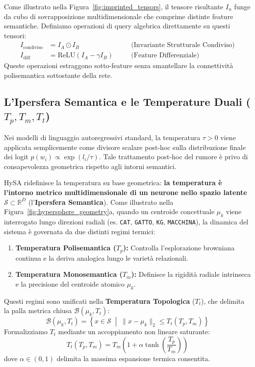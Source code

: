 \documentclass[11pt,a4paper]{article}
\theoremstyle{definition}
\begin{document}
Come illustrato nella Figura~\ref{fig:imprinted_tensors}, il tensore risultante $I_n$ funge da cubo di sovrapposizione multidimensionale che comprime distinte feature semantiche. Definiamo operazioni di query algebrica direttamente su questi tensori:
\begin{align}
    I_{\mathrm{condiviso}} &= I_A \odot I_B \quad &&\text{(Invariante Strutturale Condiviso)} \\
    I_{\mathrm{diff}} &= \mathrm{ReLU}(I_A - \gamma I_B) \quad &&\text{(Feature Differenziale)}
\end{align}
Queste operazioni estraggono sotto-feature senza smantellare la connettività polisemantica sottostante della rete.

\subsection{L'Ipersfera Semantica e le Temperature Duali (\texorpdfstring{$T_p, T_m, T_t$}{Tp, Tm, Tt})}
Nei modelli di linguaggio autoregressivi standard, la temperatura $\tau > 0$ viene applicata semplicemente come divisore scalare post-hoc sulla distribuzione finale dei logit $p(w_i) \propto \exp(l_i / \tau)$. Tale trattamento post-hoc del rumore è privo di consapevolezza geometrica rispetto agli intorni semantici.

HySA ridefinisce la temperatura su base geometrica: \textbf{la temperatura è l'intorno metrico multidimensionale di un neurone nello spazio latente $\mathcal{S} \subset \mathbb{R}^D$} (l'\textbf{Ipersfera Semantica}). Come illustrato nella Figura~\ref{fig:hypersphere_geometry}a, quando un centroide concettuale $\mu_k$ viene interrogato lungo direzioni radiali (es. \texttt{CAT}, \texttt{GATTO}, \texttt{KG}, \texttt{MACCHINA}), la dinamica del sistema è governata da due distinti regimi termici:
\begin{enumerate}[leftmargin=*, itemsep=2.0pt]
    \item \textbf{Temperatura Polisemantica ($T_p$):} Controlla l'esplorazione browniana continua e la deriva analogica lungo le varietà relazionali.
    \item \textbf{Temperatura Monosemantica ($T_m$):} Definisce la rigidità radiale intrinseca e la precisione del centroide atomico $\mu_k$.
\end{enumerate}

Questi regimi sono unificati nella \textbf{Temperatura Topologica} ($T_t$), che delimita la palla metrica chiusa $\mathcal{B}(\mu_k, T_t)$:
\begin{equation}
    \mathcal{B}(\mu_k, T_t) = \left\{ x \in \mathcal{S} \;\middle|\; \| x - \mu_k \|_2 \le T_t(T_p, T_m) \right\}
\end{equation}
Formalizziamo $T_t$ mediante un accoppiamento non lineare saturante:
\begin{equation}
    T_t(T_p, T_m) = T_m \left( 1 + \alpha \tanh\left( \frac{T_p}{T_m} \right) \right)
    \label{eq:tt_coupling}
\end{equation}
dove $\alpha \in (0, 1)$ delimita la massima espansione termica consentita.
\end{document}
